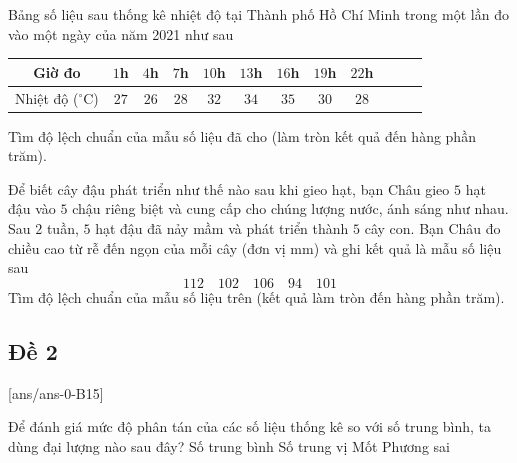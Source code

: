 \begin{ex}%
	Bảng số liệu sau thống kê nhiệt độ tại Thành phố Hồ Chí Minh trong một lần đo vào một ngày của năm 2021 như sau
	\begin{center}
		\begin{tabular}{|c|c|c|c|c|c|c|c|c|c|c|c}
			\hline Giờ đo & $1$h & $4$h & $7$h & $10$h & $13$h & $16$h & $19$h & $22$h   \\
			\hline Nhiệt độ ($^\circ \mathrm{C}$) & $27$ & $26$ & $28$ & $32$ & $34$ & $35$ & $30$ & $28$  \\
			\hline 
		\end{tabular}
	\end{center}
	Tìm độ lệch chuẩn của mẫu số liệu đã cho (làm tròn kết quả đến hàng phần trăm).
\end{ex}

\begin{ex}%
	Để biết cây đậu phát triển như thế nào sau khi gieo hạt, bạn Châu gieo $5$ hạt đậu vào $5$ chậu riêng biệt và cung cấp cho chúng lượng nước, ánh sáng như nhau. Sau $2$ tuần, $5$ hạt đậu đã nảy mầm và phát triển thành $5$ cây con. Bạn Châu đo chiều cao từ rễ đến ngọn của mỗi cây (đơn vị mm) và ghi kết quả là mẫu số liệu sau
	\[ 112 \quad 102 \quad 106 \quad 94 \quad 101 \]
	Tìm độ lệch chuẩn của mẫu số liệu trên (kết quả làm tròn đến hàng phần trăm).
\end{ex}

\subsection{Đề 2}
[ans/ans-0-B15]
\caulc
\begin{ex}%
	Để đánh giá mức độ phân tán của các số liệu thống kê so với số trung bình, ta dùng đại lượng nào sau đây?
	\choice
	{Số trung bình}
	{Số trung vị}
	{Mốt}
	{\True Phương sai}
\end{ex}	


